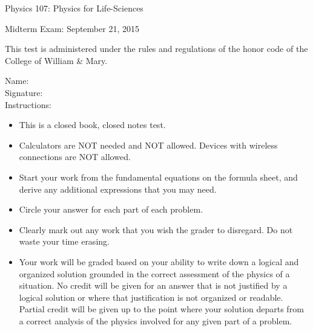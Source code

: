 \documentclass[letterpaper,addpoints,answers]{exam}
\begin{document}
\begin{coverpages}
 \large\bfseries
 
 \noindent 
 Physics 107: Physics for Life-Sciences

 \vspace{2ex}
 \noindent
 Midterm Exam: September 21, 2015

 \vspace{3ex}
 \noindent 
 This test is administered under the rules and regulations of the honor code of the College of William \& Mary.

 \vspace{2ex}
 \noindent 
 Name:\enspace\makebox[2.3in]{\hrulefill} \\

 \noindent 
 Signature:\enspace\makebox[2in]{\hrulefill} \\

 \vspace{5ex}
 \noindent 
 Instructions:
 \begin{itemize}
  \item This is a closed book, closed notes test.
  \item Calculators are NOT needed and NOT allowed. Devices with wireless connections are NOT allowed.
  \item Start your work from the fundamental equations on the formula sheet, and derive any additional expressions that you may need.
  \item Circle your answer for each part of each problem. 
  \item Clearly mark out any work that you wish the grader to disregard.  Do not waste your time erasing.
  \item Your work will be graded based on your ability to write down a logical and organized solution grounded in the correct assessment of the physics of a situation. No credit will be given for an answer that is not justified by a logical solution or where that justification is not organized or readable. Partial credit will be given up to the point where your solution departs from a correct analysis of the physics involved for any given part of a problem.
 \end{itemize}

 \pagebreak

 \begin{center}
  \gradetable[v][questions]
 \end{center}
 
\end{coverpages}
 
\end{document}
